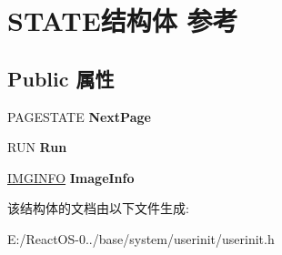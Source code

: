 \hypertarget{struct_s_t_a_t_e}{}\section{S\+T\+A\+T\+E结构体 参考}
\label{struct_s_t_a_t_e}
\subsection*{Public 属性}
\begin{DoxyCompactItemize}
\item 
\mbox{\label{struct_s_t_a_t_e_ae1d5f62b4c9d1922cba8388b4d1c5d96}} 
P\+A\+G\+E\+S\+T\+A\+TE {\bfseries Next\+Page}
\item 
\mbox{\label{struct_s_t_a_t_e_a6731811e25cde95c16052dfbff5ad4e9}} 
R\+UN {\bfseries Run}
\item 
\mbox{\label{struct_s_t_a_t_e_a4f7c06abae52b501e7a65c7801c62209}} 
\hyperlink{struct___i_m_g_i_n_f_o}{I\+M\+G\+I\+N\+FO} {\bfseries Image\+Info}
\end{DoxyCompactItemize}


该结构体的文档由以下文件生成\+:\begin{DoxyCompactItemize}
\item 
E\+:/\+React\+O\+S-\/0../base/system/userinit/userinit.\+h\end{DoxyCompactItemize}
